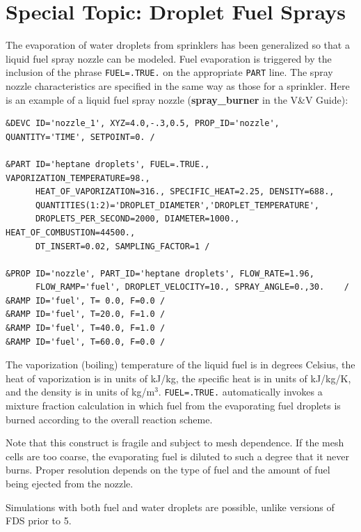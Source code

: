\documentclass[11pt]{book}
\newcommand{\ct}{\tt\small}
\begin{document}
\section{Special Topic: Droplet Fuel Sprays}

The evaporation of water droplets from sprinklers has been
generalized so that a liquid fuel spray
nozzle can be modeled. Fuel evaporation is triggered by the inclusion of the
phrase {\ct FUEL=.TRUE.} on the appropriate {\ct PART} line.
The spray nozzle characteristics are specified
in the same way as those for a sprinkler. Here is an example of a liquid fuel spray nozzle ({\bf spray\_burner} in the V\&V Guide):

\footnotesize
\begin{verbatim}
&DEVC ID='nozzle_1', XYZ=4.0,-.3,0.5, PROP_ID='nozzle', QUANTITY='TIME', SETPOINT=0. /

&PART ID='heptane droplets', FUEL=.TRUE., VAPORIZATION_TEMPERATURE=98.,
      HEAT_OF_VAPORIZATION=316., SPECIFIC_HEAT=2.25, DENSITY=688.,
      QUANTITIES(1:2)='DROPLET_DIAMETER','DROPLET_TEMPERATURE',
      DROPLETS_PER_SECOND=2000, DIAMETER=1000., HEAT_OF_COMBUSTION=44500.,
      DT_INSERT=0.02, SAMPLING_FACTOR=1 /

&PROP ID='nozzle', PART_ID='heptane droplets', FLOW_RATE=1.96,
      FLOW_RAMP='fuel', DROPLET_VELOCITY=10., SPRAY_ANGLE=0.,30.    /
&RAMP ID='fuel', T= 0.0, F=0.0 /
&RAMP ID='fuel', T=20.0, F=1.0 /
&RAMP ID='fuel', T=40.0, F=1.0 /
&RAMP ID='fuel', T=60.0, F=0.0 /
\end{verbatim}
\normalsize

\noindent
The vaporization (boiling) temperature of
the liquid fuel is in degrees Celsius, the heat of vaporization
is in units of kJ/kg, the specific heat is in units of
kJ/kg/K, and the density is in units of kg/m$^3$.
{\ct FUEL=.TRUE.} automatically
invokes a mixture fraction calculation in which fuel
from the evaporating fuel droplets is burned according to the overall reaction scheme.

Note
that this construct is fragile and subject to mesh
dependence. If the mesh cells are too coarse, the
evaporating fuel is diluted to such a degree that it
never burns. Proper resolution depends on the type of
fuel and the amount of fuel being ejected from the
nozzle.

\begin{warning}
Simulations with both fuel and water droplets are possible, unlike versions of FDS prior to 5.
\end{warning}
\end{document}
